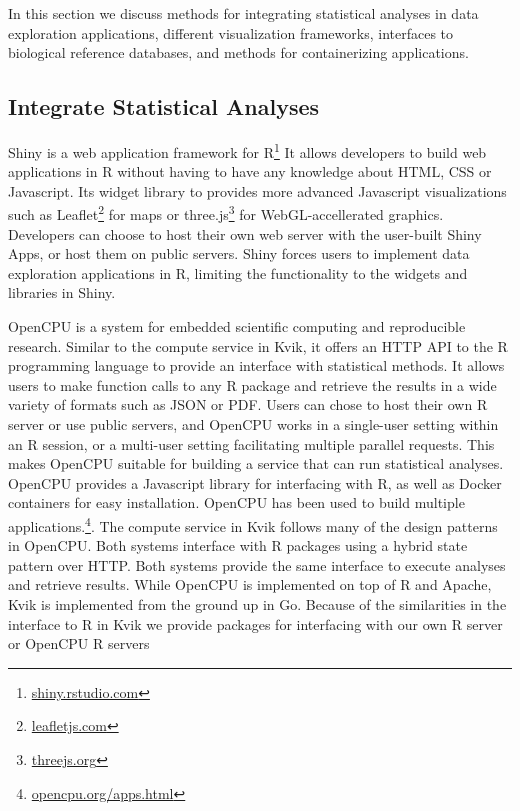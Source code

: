 In this section we discuss methods for integrating statistical analyses in data
exploration applications, different visualization frameworks, interfaces to
biological reference databases, and methods for containerizing applications. 

\subsection*{Integrate Statistical Analyses} 
Shiny is a web application framework for R\footnote{\url{shiny.rstudio.com}}
It allows developers to build web applications in R without having to have any
knowledge about HTML, CSS or Javascript. 
Its widget library to provides more advanced Javascript
visualizations such as Leaflet\footnote{\url{leafletjs.com}} for maps or
three.js\footnote{\url{threejs.org}} for WebGL-accellerated
graphics. Developers can choose to host their own web server with the user-built
Shiny Apps, or host them on public servers. Shiny forces users to implement data
exploration applications in R, limiting the functionality to the 
widgets and libraries in Shiny. 

OpenCPU is a system for embedded scientific computing and reproducible
research.\cite{opencpu} Similar to the compute service in Kvik, it offers an
HTTP API to the R programming language to provide an interface with statistical
methods. It allows users to make function calls to any R package and retrieve
the results in a wide variety of formats such as JSON or PDF. 
Users can chose to host their own R server or use public servers, and OpenCPU
works in a single-user setting within an R session, or a multi-user setting
facilitating multiple parallel requests. This makes OpenCPU suitable
for building a service that can run statistical analyses. 
OpenCPU provides a Javascript library for interfacing with R, as well as Docker
containers for easy installation. OpenCPU has been used to build multiple
applications.\footnote{\url{opencpu.org/apps.html}}. 
The compute service in Kvik follows many of the design patterns in
OpenCPU. Both systems interface with R packages using a hybrid state pattern
over HTTP. Both systems provide the same interface to execute analyses and
retrieve results.  While OpenCPU is implemented on top of R and Apache, Kvik is
implemented from the ground up in Go. Because of the similarities in the
interface to R in Kvik we provide packages for interfacing with our own R server
or OpenCPU R servers

